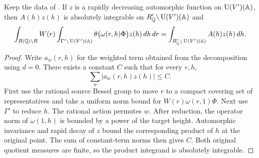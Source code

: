 \begin{lemma}
\label{lem:a-bessel-unfold-integral}
\emitthmsource
Keep the data of . If $z$ is a rapidly decreasing automorphic function on $\operatorname{U}(V')(\mathbb A)$, then $A(h)z(h)$ is absolutely integrable on $R'_{\mathbb Q}\backslash \operatorname{U}(V')(\mathbb A)$ and
\[
 \int_{R(\mathbb Q)\backslash R} W(r)
   \int_{\Gamma'\backslash \operatorname{U}(V')(\mathbb A)}
     \theta\bigl(\omega(r,h)\Phi\bigr)z(h)\,dh\,dr
  =
 \int_{R'_{\mathbb Q}\backslash \operatorname{U}(V')(\mathbb A)}
     A(h)z(h)\,dh .
\]
\end{lemma}
\begin{proof}
Write $a_w(r,h)$ for the weighted term obtained from the decomposition using $d=0$. There exists a constant $C$ such that for every $r,h$,
\[
 \sum_w|a_w(r,h)z(h)|\le C.
\]
First use the rational source Bessel group to move $r$ to a compact covering set of representatives and take a uniform norm bound for $W(r)\omega(r,1)\Phi$. Next use $\Gamma'$ to reduce $h$. The rational action permutes $w$. After reduction, the operator norm of $\omega(1,h)$ is bounded by a power of the target height. Automorphic invariance and rapid decay of $z$ bound the corresponding product of $h$ at the original point. The sum of constant-term norms then gives $C$. Both original quotient measures are finite, so the product integrand is absolutely integrable.


\end{proof}
